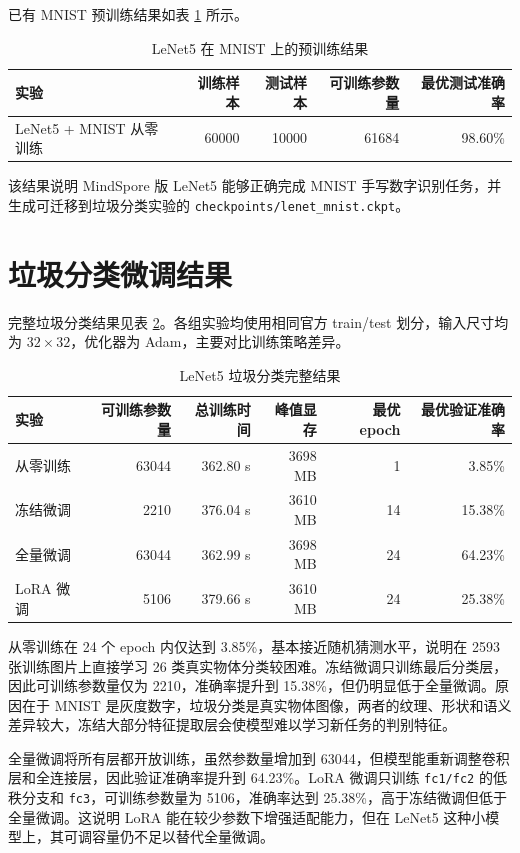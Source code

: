 \documentclass[UTF8,a4paper,zihao=-4]{ctexbook}
\begin{document}
已有 MNIST 预训练结果如表 \ref{tab:mnist} 所示。

\begin{table}[H]
\centering
\caption{LeNet5 在 MNIST 上的预训练结果}
\label{tab:mnist}
\begin{tabular}{lrrrr}
\toprule
实验 & 训练样本 & 测试样本 & 可训练参数量 & 最优测试准确率 \\
\midrule
LeNet5 + MNIST 从零训练 & 60000 & 10000 & 61684 & 98.60\% \\
\bottomrule
\end{tabular}
\end{table}

该结果说明 MindSpore 版 LeNet5 能够正确完成 MNIST 手写数字识别任务，并生成可迁移到垃圾分类实验的 \texttt{checkpoints/lenet\_mnist.ckpt}。

\section{垃圾分类微调结果}

完整垃圾分类结果见表 \ref{tab:garbage_existing}。各组实验均使用相同官方 train/test 划分，输入尺寸均为 $32 \times 32$，优化器为 Adam，主要对比训练策略差异。

\begin{table}[H]
\centering
\caption{LeNet5 垃圾分类完整结果}
\label{tab:garbage_existing}
\begin{tabular}{lrrrrr}
\toprule
实验 & 可训练参数量 & 总训练时间 & 峰值显存 & 最优 epoch & 最优验证准确率 \\
\midrule
从零训练 & 63044 & 362.80 s & 3698 MB & 1 & 3.85\% \\
冻结微调 & 2210 & 376.04 s & 3610 MB & 14 & 15.38\% \\
全量微调 & 63044 & 362.99 s & 3698 MB & 24 & 64.23\% \\
LoRA 微调 & 5106 & 379.66 s & 3610 MB & 24 & 25.38\% \\
\bottomrule
\end{tabular}
\end{table}

从零训练在 24 个 epoch 内仅达到 3.85\%，基本接近随机猜测水平，说明在 2593 张训练图片上直接学习 26 类真实物体分类较困难。冻结微调只训练最后分类层，因此可训练参数量仅为 2210，准确率提升到 15.38\%，但仍明显低于全量微调。原因在于 MNIST 是灰度数字，垃圾分类是真实物体图像，两者的纹理、形状和语义差异较大，冻结大部分特征提取层会使模型难以学习新任务的判别特征。

全量微调将所有层都开放训练，虽然参数量增加到 63044，但模型能重新调整卷积层和全连接层，因此验证准确率提升到 64.23\%。LoRA 微调只训练 \texttt{fc1/fc2} 的低秩分支和 \texttt{fc3}，可训练参数量为 5106，准确率达到 25.38\%，高于冻结微调但低于全量微调。这说明 LoRA 能在较少参数下增强适配能力，但在 LeNet5 这种小模型上，其可调容量仍不足以替代全量微调。
\end{document}
